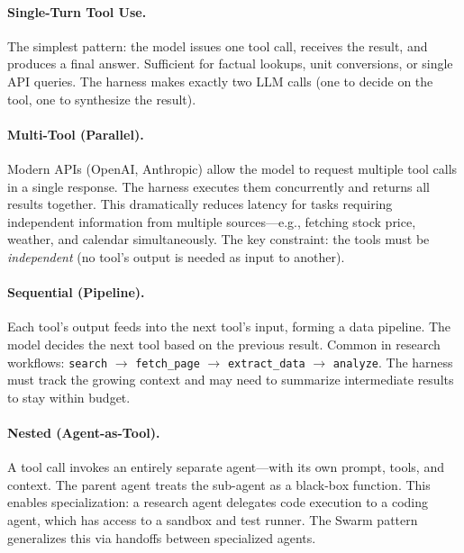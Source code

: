 \paragraph{Single-Turn Tool Use.}
\label{single-turn-tool-use.}

The simplest pattern: the model issues one tool call, receives the result, and produces a final answer. Sufficient for factual lookups, unit conversions, or single API queries. The harness makes exactly two LLM calls (one to decide on the tool, one to synthesize the result).

\paragraph{Multi-Tool (Parallel).}
\label{multi-tool-parallel.}

Modern APIs (OpenAI, Anthropic) allow the model to request multiple tool calls in a single response. The harness executes them concurrently and returns all results together. This dramatically reduces latency for tasks requiring independent information from multiple sources---e.g., fetching stock price, weather, and calendar simultaneously. The key constraint: the tools must be \emph{independent} (no tool’s output is needed as input to another).

\paragraph{Sequential (Pipeline).}
\label{sequential-pipeline.}

Each tool’s output feeds into the next tool’s input, forming a data pipeline. The model decides the next tool based on the previous result. Common in research workflows: \texttt{search} $\to$ \texttt{fetch\_page} $\to$ \texttt{extract\_data} $\to$ \texttt{analyze}. The harness must track the growing context and may need to summarize intermediate results to stay within budget.

\paragraph{Nested (Agent-as-Tool).}
\label{nested-agent-as-tool.}

A tool call invokes an entirely separate agent---with its own prompt, tools, and context. The parent agent treats the sub-agent as a black-box function. This enables specialization: a research agent delegates code execution to a coding agent, which has access to a sandbox and test runner. The Swarm pattern~\cite{openai2024swarm} generalizes this via handoffs between specialized agents.

